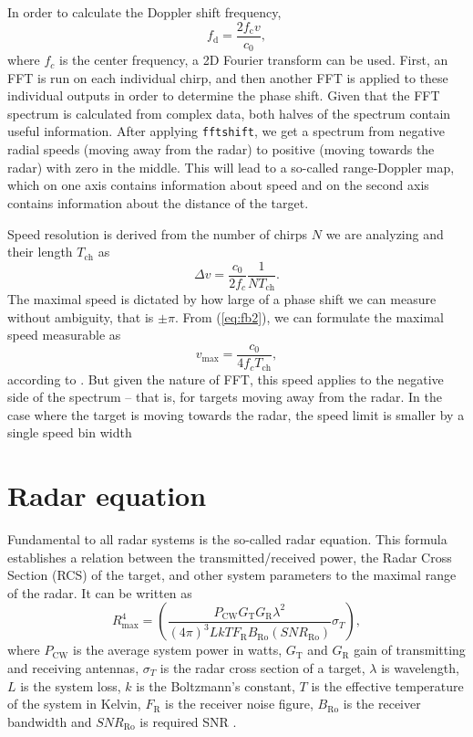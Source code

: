 In order to calculate the Doppler shift frequency,
\begin{equation}
  f_\mathrm{d} = \frac{2f_\mathrm{c}v}{c_0},
  \label{eq:Doppler2}
\end{equation}
where $f_c$ is the center frequency, a 2D Fourier transform can be used.
First, an FFT is run on each individual chirp, and then another FFT is applied to these individual outputs in order to determine the phase shift.
Given that the FFT spectrum is calculated from complex data, both halves of the spectrum contain useful information.
After applying \verb|fftshift|, we get a spectrum from negative radial speeds (moving away from the radar) to positive (moving towards the radar) with zero in the middle.
This will lead to a so-called range-Doppler map, which on one axis contains information about speed and on the second axis contains information about the distance of the target.

Speed resolution is derived from the number of chirps $N$ we are analyzing and their length $T_{\mathrm{ch}}$ as \cite{suleymanov2016}
\begin{equation}
  \Delta v = \frac{c_0}{2f_c} \frac{1}{NT_{\mathrm{ch}}}.
  \label{eq:Doppler3}
\end{equation}
The maximal speed is dictated by how large of a phase shift we can measure without ambiguity, that is $\pm \pi$.
From (\ref{eq:fb2}), we can formulate the maximal speed measurable as
\[
  v_\mathrm{max} = \frac{c_0}{4f_c T_\mathrm{ch}},
\]
according to \cite{fmcwSpeed}.
But given the nature of FFT, this speed applies to the negative side of the spectrum -- that is, for targets moving away from the radar.
In the case where the target is moving towards the radar, the speed limit is smaller by a single speed bin width

\section{Radar equation}

Fundamental to all radar systems is the so-called radar equation.
This formula establishes a relation between the transmitted/received power, the Radar Cross Section (RCS) of the target, and other system parameters to the maximal range of the radar.
It can be written as
\begin{equation}
	R_\mathrm{max}^4 = \left(\frac{P_{\mathrm{CW}}G_\mathrm{T}G_\mathrm{R}\lambda^2}{(4\pi)^3 L k T F_\mathrm{R}B_\mathrm{Ro}(SNR_\mathrm{Ro})} \sigma_T\right),
	\label{eq:radar_eq}
\end{equation}
where $P_\mathrm{CW}$ is the average system power in watts, $G_\mathrm{T}$ and $G_\mathrm{R}$ gain of transmitting and receiving antennas, $\sigma_T$ is the radar cross section of a target, $\lambda$ is wavelength, $L$ is the system loss, $k$ is the Boltzmann's constant, $T$ is the effective temperature of the system in Kelvin, $F_\mathrm{R}$ is the receiver noise figure, $B_\mathrm{Ro}$ is the receiver bandwidth and $SNR_\mathrm{Ro}$ is required SNR \cite{jankiraman2018}.


